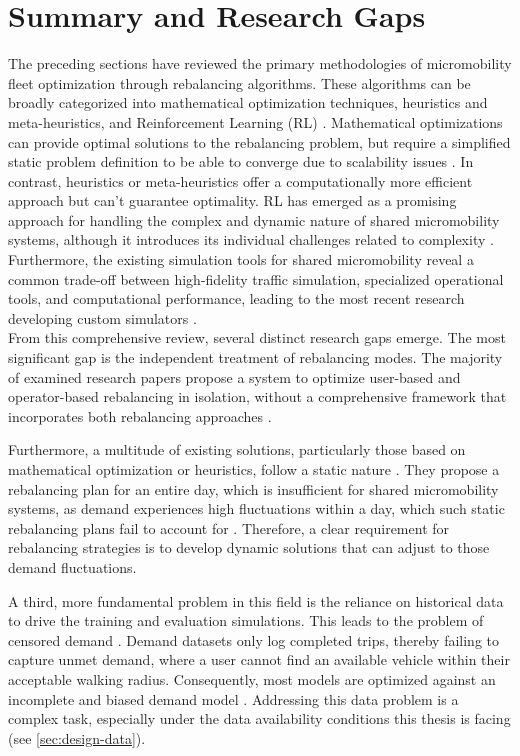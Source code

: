 \section{Summary and Research Gaps}
The preceding sections have reviewed the primary methodologies of micromobility fleet optimization through rebalancing algorithms.
These algorithms can be broadly categorized into mathematical optimization techniques, heuristics and meta-heuristics, and Reinforcement Learning (RL) \cite{jimenez-merono_optimization_2024, tu_overview_2023}.
Mathematical optimizations can provide optimal solutions to the rebalancing problem, but require a simplified static problem definition to be able to converge due to scalability issues \cite{jimenez-merono_optimization_2024}.
In contrast, heuristics or meta-heuristics offer a computationally more efficient approach but can't guarantee optimality.
RL has emerged as a promising approach for handling the complex and dynamic nature of shared micromobility systems, although it introduces its individual challenges related to complexity \cite{chouaki_review_2025}.
Furthermore, the existing simulation tools for shared micromobility reveal a common trade-off between high-fidelity traffic simulation, specialized operational tools, and computational performance, leading to the most recent research developing custom simulators \cite{sanchez_simulation_2022, rocchetta_optimization_2025}.
\\

From this comprehensive review, several distinct research gaps emerge. 
The most significant gap is the independent treatment of rebalancing modes.
The majority of examined research papers propose a system to optimize user-based and operator-based rebalancing in isolation, without a comprehensive framework that incorporates both rebalancing approaches \cite{emami_integrated_2024}.

Furthermore, a multitude of existing solutions, particularly those based on mathematical optimization or heuristics, follow a static nature \cite{jimenez-merono_optimization_2024}.
They propose a rebalancing plan for an entire day, which is insufficient for shared micromobility systems, as demand experiences high fluctuations within a day, which such static rebalancing plans fail to account for \cite{li_dynamic_2018}.
Therefore, a clear requirement for rebalancing strategies is to develop dynamic solutions that can adjust to those demand fluctuations.

A third, more fundamental problem in this field is the reliance on historical data to drive the training and evaluation simulations.
This leads to the problem of censored demand \cite{gammelli_estimating_2020}.
Demand datasets only log completed trips, thereby failing to capture unmet demand, where a user cannot find an available vehicle within their acceptable walking radius.
Consequently, most models are optimized against an incomplete and biased demand model \cite{gammelli_estimating_2020}.
Addressing this data problem is a complex task, especially under the data availability conditions this thesis is facing (see \autoref{sec:design-data}).

